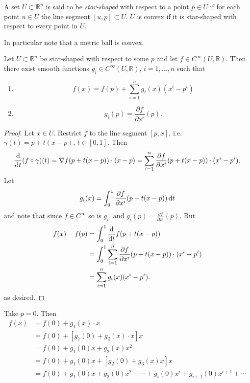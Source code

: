 \begin{defn}
A set $U \subset \mathbb{R}^n$ is said to be \emph{star-shaped} with
respect to a point $p \in U$ if for each point $u \in U$ the line
segment $[u, p] \subset U$. $U$ is convex if it is star-shaped with
respect to every point in $U$.
\end{defn}

In particular note that a metric ball is convex.

\begin{theorem}
Let $U \subset \mathbb{R}^n$ be star-shaped with respect to some $p$
and let $f \in C^\infty(U, \mathbb{R})$. Then there exist smooth
functions $g_i \in C^\infty(U, \mathbb{R})$, $i = 1, \dots, n$ such
that
\begin{enumerate}
  \item{
    $$
    f(x) = f(p) + \sum_{i=1}^n g_i(x) (x^i - p^i)
    $$
  }
  \item{
    $$
    g_i(p) = \frac{\partial f}{\partial x^i} (p).
    $$
  }
\end{enumerate}
\end{theorem}

\begin{proof}
Let $x \in U$. Restrict $f$ to the line segment $[p, x]$,
i.e. $\gamma(t) = p + t(x - p)$, $t \in [0, 1]$. Then
$$
  \frac{\mathop{}\!\mathrm{d}}{\mathop{}\!\mathrm{d} t} (f \circ \gamma) (t)
= \nabla f (p + t(x - p)) \cdot (x - p)
= \sum_{i=1}^n
    \frac{\partial f}
         {\partial x^i}
    (p + t(x - p))
    \cdot
    (x^i - p^i).
$$
Let
$$
  g_i(x)
= \int_0^1
    \frac{\partial f}
         {\partial x^i}
    (p + t(x - p))
    \mathop{}\!\mathrm{d} t
$$
and note that since $f \in C^\infty$ so is $g_i$, and
$g_i(p) = \frac{\partial f}{\partial x^i}(p)$. But
\begin{align*}
   f(x) - f(p)
&= \int_0^1
    \frac{\mathop{}\!\mathrm{d}}{\mathop{}\!\mathrm{d} t}
      f(p + t(x - p)) \\
&= \int_0^1
     \sum_{i=1}^n
       \frac{\partial f}
            {\partial x^i}
       (p + t(x - p))
       \cdot
       (x^i - p^i) \\
&= \sum_{i=1}^n
     g_i(x) (x^i - p^i).
\end{align*}
as desired.
\end{proof}

Take $p = 0$. Then
\begin{align*}
   f(x)
&= f(0) + g_1(x) \cdot x \\
&= f(0) + [g_1(0) + g_2(x) \cdot x] x \\
&= f(0) + g_1(0) x + g_2(x) x^2 \\
&= f(0) + g_1(0) x + [g_2(0) + g_3(x) x] x \\
&= f(0)
 + g_1(0) x
 + g_2(0) x^2
 + \cdots
 + g_i(0) x^i
 + g_{i+1}(0) x^{i+1}
 + \cdots
\end{align*}

